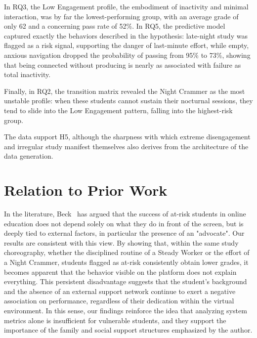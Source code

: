 In RQ3, the Low Engagement profile, the embodiment of inactivity and minimal interaction, was by far the lowest-performing group, with an average grade of only 62 and a concerning pass rate of 52\%. In RQ5, the predictive model captured exactly the behaviors described in the hypothesis: late-night study was flagged as a risk signal, supporting the danger of last-minute effort, while empty, anxious navigation dropped the probability of passing from 95\% to 73\%, showing that being connected without producing is nearly as associated with failure as total inactivity.

Finally, in RQ2, the transition matrix revealed the Night Crammer as the most unstable profile: when these students cannot sustain their nocturnal sessions, they tend to slide into the Low Engagement pattern, falling into the highest-risk group.

The data support H5, although the sharpness with which extreme disengagement and irregular study manifest themselves also derives from the architecture of the data generation.

\section{Relation to Prior Work}
\label{sec:relation-to-prior-work}

In the literature, Beck~\cite{beck_atrisk_2024, beck_prepared_2023} has argued that the success of at-risk students in online education does not depend solely on what they do in front of the screen, but is deeply tied to external factors, in particular the presence of an "advocate". Our results are consistent with this view. By showing that, within the same study choreography, whether the disciplined routine of a Steady Worker or the effort of a Night Crammer, students flagged as at-risk consistently obtain lower grades, it becomes apparent that the behavior visible on the platform does not explain everything. This persistent disadvantage suggests that the student's background and the absence of an external support network continue to exert a negative association on performance, regardless of their dedication within the virtual environment. In this sense, our findings reinforce the idea that analyzing system metrics alone is insufficient for vulnerable students, and they support the importance of the family and social support structures emphasized by the author.

